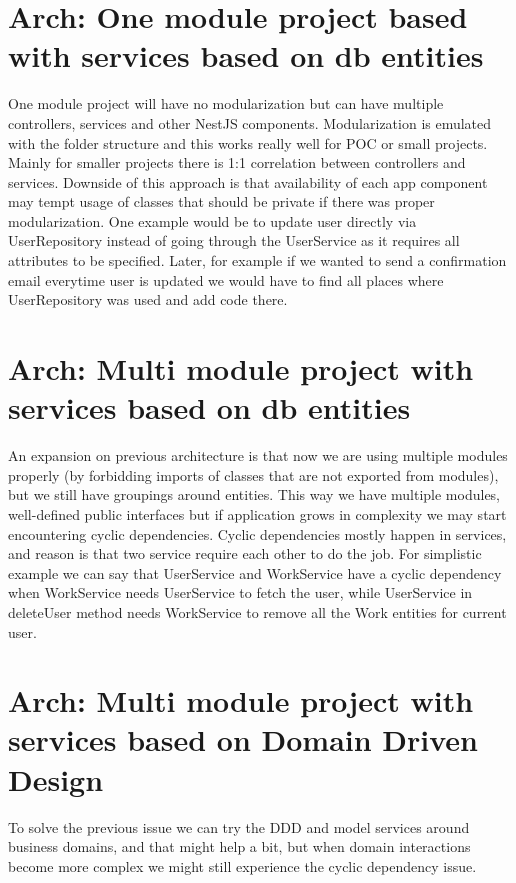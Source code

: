 \section{Arch: One module project based with services based on db entities}\label{sec:arch-om-db}

One module project will have no modularization but can have multiple controllers, services and other NestJS components.
Modularization is emulated with the folder structure and this works really well for POC or small projects.
Mainly for smaller projects there is 1:1 correlation between controllers and services.
Downside of this approach is that availability of each app component may tempt usage of classes that should be private
if there was proper modularization.
One example would be to update user directly via UserRepository instead of going through the UserService as it requires
all attributes to be specified.
Later, for example if we wanted to send a confirmation email everytime user is updated we would have to find all places
where UserRepository was used and add code there.

\section{Arch: Multi module project with services based on db entities}\label{sec:arch-mm-db}

An expansion on previous architecture is that now we are using multiple modules properly
(by forbidding imports of classes that are not exported from modules), but we still have groupings around entities.
This way we have multiple modules, well-defined public interfaces but if application grows in complexity we may start
encountering cyclic dependencies.
Cyclic dependencies mostly happen in services, and reason is that two service require each other to do the job.
For simplistic example we can say that UserService and WorkService have a cyclic dependency
when WorkService needs UserService to fetch the user, while UserService in deleteUser method needs WorkService
to remove all the Work entities for current user.

\section{Arch: Multi module project with services based on Domain Driven Design}\label{sec:arch-mm-ddd}

To solve the previous issue we can try the DDD and model services around business domains, and that might help a bit,
but when domain interactions become more complex we might still experience the cyclic dependency issue.

